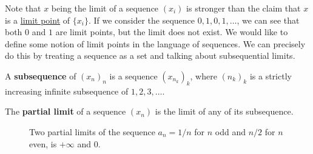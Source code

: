   Note that $x$ being the limit of a sequence $(x_i)$ is stronger than the claim that $x$ is a \hyperref[def:limit-point]{limit point} of $\{x_i\}$. If we consider the sequence $0, 1, 0, 1, \ldots$, we can see that both $0$ and $1$ are limit points, but the limit does not exist. We would like to define some notion of limit points in the language of sequences. We can precisely do this by treating a sequence as a set and talking about subsequential limits. 

  \begin{definition}[Subsequences]
    \label{def:subsequences}
    A \textbf{subsequence} of $(x_n)_n$ is a sequence $(x_{n_k})_k$, where $(n_k)_k$ is a strictly increasing infinite subsequence of $1, 2, 3, \ldots$. 
  \end{definition}

  \begin{definition}
    \label{def:partial-limits}
    The \textbf{partial limit} of a sequence $(x_n)$ is the limit of any of its subsequence.  

    \begin{figure}[H]
      \centering 
      \caption{Two partial limits of the sequence $a_n = 1/n$ for $n$ odd and $n/2$ for $n$ even, is $+\infty$ and $0$. } 
      \label{fig:partial_limit}
    \end{figure}
  \end{definition}
	
